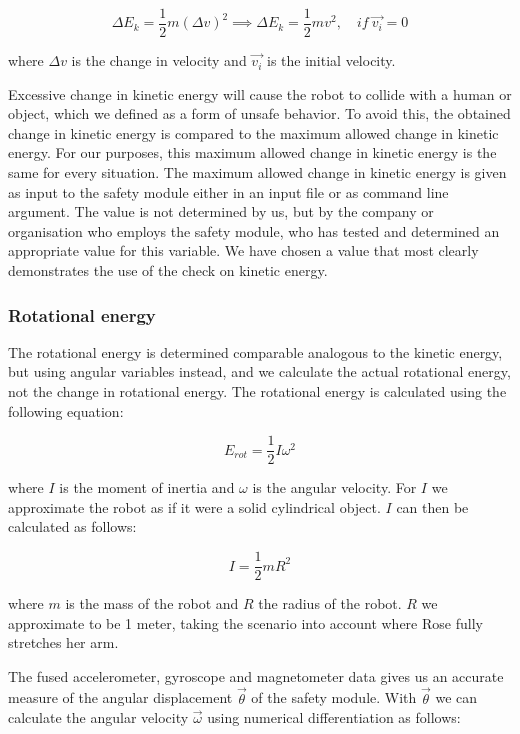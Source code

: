 \documentclass[12pt]{scrreprt}
\begin{document}
\begin{equation} \label{eq:change_ke}
    \Delta E_k = \frac{1}{2}m(\Delta v)^2 \implies \Delta E_k = \frac{1}{2}mv^2,\quad if\ \vec{v_i} = 0
\end{equation}

where $\Delta v$ is the change in velocity and $\vec{v_i}$ is the initial velocity.
\par
Excessive change in kinetic energy will cause the robot to collide with a human or object, which we defined as a form of unsafe behavior. To avoid this, the obtained change in kinetic energy is compared to the maximum allowed change in kinetic energy. For our purposes, this maximum allowed change in kinetic energy is the same for every situation. The maximum allowed change in kinetic energy is given as input to the safety module either in an input file or as command line argument. The value is not determined by us, but by the company or organisation who employs the safety module, who has tested and determined an appropriate value for this variable. We have chosen a value that most clearly demonstrates the use of the check on kinetic energy.

\subsubsection{Rotational energy}
\label{Rotational energy}
The rotational energy is determined comparable analogous to the kinetic energy, but using angular variables instead, and we calculate the actual rotational energy, not the change in rotational energy. The rotational energy is calculated using the following equation:

\begin{equation}
    E_{rot} = \frac{1}{2}I\omega^2
\end{equation}

where $I$ is the moment of inertia and $\omega$ is the angular velocity. For $I$ we approximate the robot as if it were a solid cylindrical object. $I$ can then be calculated as follows:

\begin{equation}
    I = \frac{1}{2}mR^2
\end{equation}

where $m$ is the mass of the robot and $R$ the radius of the robot. $R$ we approximate to be 1 meter, taking the scenario into account where Rose fully stretches her arm.
\par
The fused accelerometer, gyroscope and magnetometer data gives us an accurate measure of the angular displacement $\vec{\theta}$ of the safety module. With $\vec{\theta}$ we can calculate the angular velocity $\vec{\omega}$ using numerical differentiation as follows:
\end{document}
